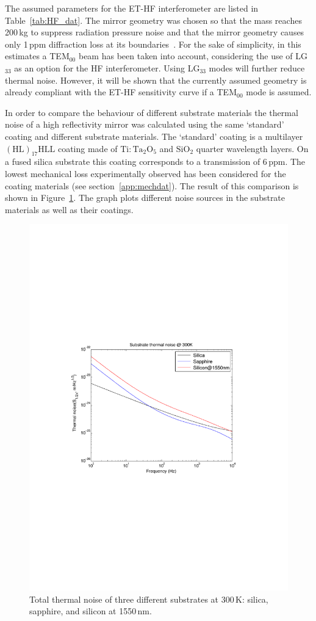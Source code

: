 The assumed parameters for the ET-HF interferometer are listed in Table~\ref{tab:HF_dat}. The mirror geometry was chosen so that the mass reaches 200\,kg to suppress radiation pressure noise and that the mirror geometry causes only 1\,ppm diffraction loss at its boundaries~\cite{Vinet2007}. For the sake of simplicity, in this estimates a TEM$_{00}$ beam has been taken into account, considering the use of LG$_{33}$ as an option for the HF interferometer. Using LG$_{33}$ modes will further reduce thermal noise. However, it will be shown that the currently assumed geometry is already compliant with the ET-HF sensitivity curve if a TEM$_{00}$ mode is assumed.

In order to compare the behaviour of different substrate materials the thermal noise of a high reflectivity mirror was calculated using the same `standard' coating and different substrate materials. The `standard' coating is a multilayer $\mathrm{(HL)_{17}HLL}$ coating made of $\mathrm{Ti:Ta_2O_5}$ and $\mathrm{SiO_2}$ quarter wavelength layers. On a fused silica substrate this coating corresponds to a transmission of 6\,ppm. The lowest mechanical loss experimentally observed has been considered for the coating materials (see section~\ref{app:mechdat}). The result of this comparison is shown in Figure~\ref{fig:substrate_comp}. The graph plots different noise sources in the substrate materials as well as their coatings. 

\begin{figure}[!h]
\begin{center}
\includegraphics[width=0.49\linewidth]{Sec_Optics/substrate_comp.pdf}
\caption{Total thermal noise of three different substrates at 300\,K: silica, sapphire, and silicon at 1550\,nm. }
\label{fig:substrate_comp}
\end{center}
\end{figure}

